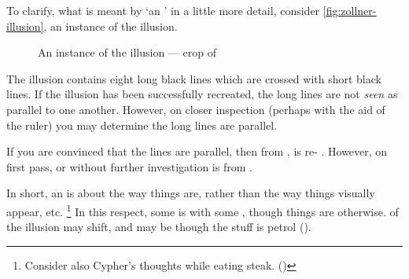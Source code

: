   \begin{note}
    \nocite{Scriven:1962vq}%
    \nocite{Woodward:2021ue}%
    \nocite{Perry:1979vc}%
    \nocite{Perry:1986aa}%
    \nocite{Collins:1997wn}%
    To clarify, what is meant by `an \agpe{}' in a little more detail, consider \autoref{fig:zollner-illusion}, an instance of the \citeauthor{Zollner:1860vx} illusion.

    \begin{figure}[!h]
      \centering
      \def\svgwidth{\columnwidth}
      
      \caption{An instance of the \citeauthor{Zollner:1860vx} illusion --- crop of ~\textcite{Fibonacci:2007vj}}
      \label{fig:zollner-illusion}
    \end{figure}

    \noindent%
    The \citeauthor{Zollner:1860vx} illusion contains eight long black lines which are crossed with short black lines.
    If the illusion has been successfully recreated, the long lines are not \emph{seen} as parallel to one another.
    However, on closer inspection (perhaps with the aid of the ruler) you may determine the long lines are parallel.

    If you are convinced that the lines are parallel, then from ,  is re-\evaled{} .
    However, on first pass, or without further investigation  is \evaled{}  from .

    In short, an \agpe{} is about the way things are, rather than the way things visually appear, etc.%
    \footnote{
      Consider also Cypher's thoughts while eating steak. (\cite[330--331]{Wachowski:2000uh})
    }
    In this respect, some  is  with some , though things are otherwise.
     of the \citeauthor{Zollner:1860vx} illusion may shift, and  may be \evaled{}  though the stuff is petrol  (\cite[cf.][18]{Williams:1979wi}).
  \end{note}


